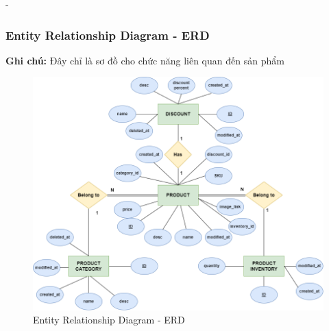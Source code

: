 \begin {list} {-}{}
\subsubsection {Entity Relationship Diagram - ERD}
\textbf{Ghi chú:} Đây chỉ là sơ đồ cho chức năng liên quan đến sản phẩm
\begin{figure}[H]
    \centering
    \includegraphics[scale=0.5]{images/hieu/chap-3/database-diagram.png}
    \caption{Entity Relationship Diagram - ERD}
\end{figure}

\end{list}
